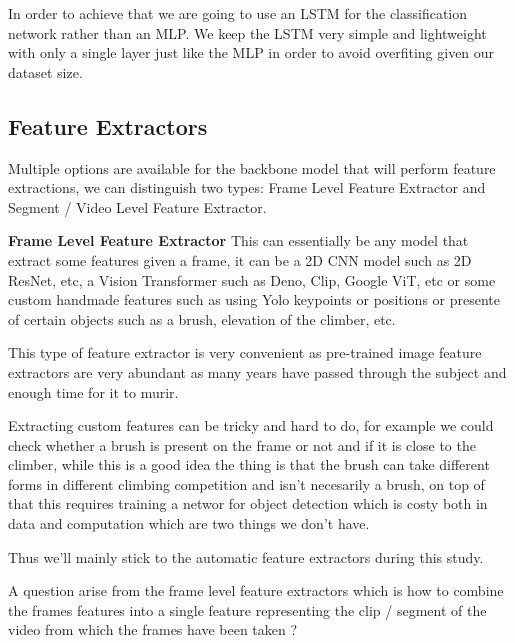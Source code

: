 In order to achieve that we are going to use an LSTM for the classification network rather than an MLP. We keep the LSTM very simple and lightweight with only a single layer just like the MLP in order to avoid overfiting given our dataset size.


\subsection*{Feature Extractors}
Multiple options are available for the backbone model that will perform feature extractions, we can distinguish two types: Frame Level Feature Extractor and Segment / Video Level Feature Extractor.


\textbf{Frame Level Feature Extractor}
This can essentially be any model that extract some features given a frame, it can be a 2D CNN model such as 2D ResNet, etc, a Vision Transformer such as Deno, Clip, Google ViT, etc or some custom handmade features such as using Yolo keypoints or positions or presente of certain objects such as a brush, elevation of the climber, etc.

This type of feature extractor is very convenient as pre-trained image feature extractors are very abundant as many years have passed through the subject and enough time for it to murir.

Extracting custom features can be tricky and hard to do, for example we could check whether a brush is present on the frame or not and if it is close to the climber, while this is a good idea the thing is that the brush can take different forms in different climbing competition and isn't necesarily a brush, on top of that this requires training a networ for object detection which is costy both in data and computation which are two things we don't have.

Thus we'll mainly stick to the automatic feature extractors during this study.

A question arise from  the frame level feature extractors which is how to combine the frames features into a single feature representing the clip / segment of the video from which the frames have been taken ?

